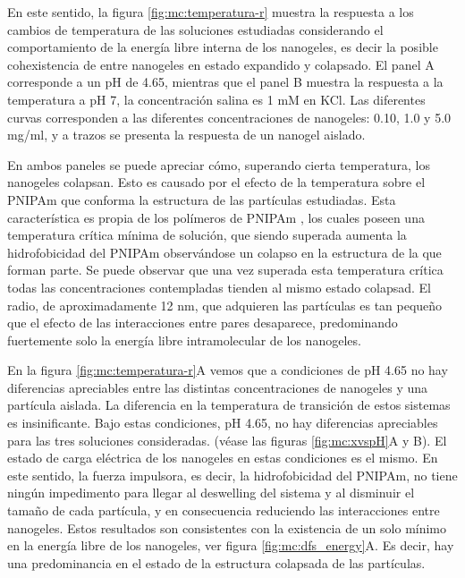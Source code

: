 	En este sentido, la figura \ref{fig:mc:temperatura-r} muestra la respuesta a los cambios de temperatura de las soluciones estudiadas considerando el comportamiento de la energ\'ia libre interna de los nanogeles, es decir la posible cohexistencia de entre nanogeles en estado expandido y colapsado. El panel A corresponde a un pH de 4.65, mientras que el panel B muestra la respuesta a la temperatura a pH 7, la concentraci\'on salina es 1 mM en KCl. Las diferentes curvas corresponden a las diferentes concentraciones de nanogeles: 0.10, 1.0 y 5.0 mg/ml, y a trazos se presenta la respuesta de un nanogel aislado.

En ambos paneles se puede apreciar c\'omo, superando cierta temperatura, los nanogeles colapsan. Esto es causado por el efecto de la temperatura sobre el PNIPAm que conforma la estructura de las part\'iculas estudiadas. Esta caracter\'istica es propia de los pol\'imeros de PNIPAm \cite{perez2021thermodynamic}, los cuales poseen una temperatura cr\'itica m\'inima de soluci\'on, que siendo superada aumenta la hidrofobicidad del PNIPAm observ\'andose un colapso en la estructura de la que forman parte. Se puede observar que una vez superada esta temperatura cr\'itica todas las concentraciones contempladas tienden al mismo estado colapsad. El radio, de aproximadamente 12 nm, que adquieren las part\'iculas es tan peque\~no que el efecto de las interacciones entre pares desaparece, predominando fuertemente solo la energ\'ia libre intramolecular de los nanogeles.

En la figura \ref{fig:mc:temperatura-r}A vemos que a condiciones de pH 4.65 no hay diferencias apreciables entre las distintas concentraciones de nanogeles y una part\'icula aislada. La diferencia en la temperatura de transici\'on de estos sistemas es insinificante. Bajo estas condiciones, pH 4.65, no hay diferencias apreciables para las tres soluciones consideradas. (v\'ease las figuras \ref{fig:mc:xvspH}A y B). El estado de carga el\'ectrica de los nanogeles en estas condiciones es el mismo. En este sentido, la fuerza impulsora, es decir, la hidrofobicidad del PNIPAm, no tiene ning\'un impedimento para llegar al deswelling del sistema y al disminuir el tama\~no de cada part\'icula, y en consecuencia reduciendo las interacciones entre nanogeles. Estos resultados son consistentes con la existencia de un solo m\'inimo en la energ\'ia libre de los nanogeles, ver figura \ref{fig:mc:dfs_energy}A. Es decir, hay una predominancia en el estado de la estructura colapsada de las part\'iculas.
	
